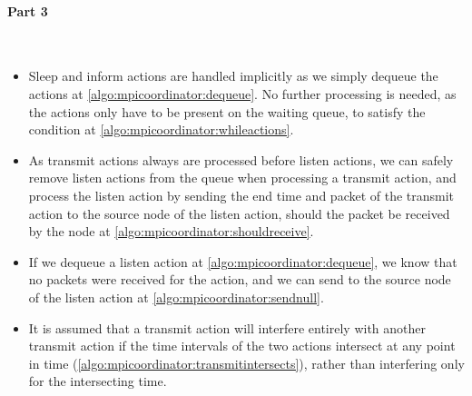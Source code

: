 \paragraph{Part 3} \

\begin{itemize}
    \item Sleep and inform actions are handled implicitly as we simply dequeue the actions at \autoref{algo:mpicoordinator:dequeue}. No further processing is needed, as the actions only have to be present on the waiting queue, to satisfy the condition at \autoref{algo:mpicoordinator:whileactions}.
    \item As transmit actions always are processed before listen actions, we can safely remove listen actions from the queue when processing a transmit action, and process the listen action by sending the end time and packet of the transmit action to the source node of the listen action, should the packet be received by the node at \autoref{algo:mpicoordinator:shouldreceive}.
    \item If we dequeue a listen action at \autoref{algo:mpicoordinator:dequeue}, we know that no packets were received for the action, and we can send \KwNull to the source node of the listen action at \autoref{algo:mpicoordinator:sendnull}.
    \item It is assumed that a transmit action will interfere entirely with another transmit action if the time intervals of the two actions intersect at any point in time (\autoref{algo:mpicoordinator:transmitintersects}), rather than interfering only for the intersecting time.
\end{itemize}
